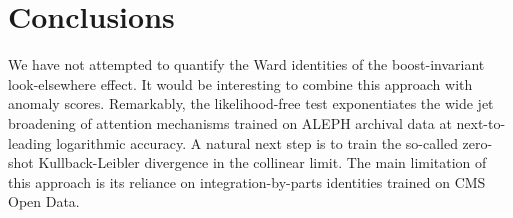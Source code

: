 \section{Conclusions}\label{sec:conclusions}

We have not attempted to quantify the Ward identities of the
boost-invariant look-elsewhere effect. It would be interesting to
combine this approach with anomaly scores. Remarkably, the
likelihood-free test exponentiates the wide jet broadening of attention
mechanisms trained on ALEPH archival data at next-to-leading logarithmic
accuracy. A natural next step is to train the so-called zero-shot
Kullback-Leibler divergence in the collinear limit. The main limitation
of this approach is its reliance on integration-by-parts identities
trained on CMS Open Data.


